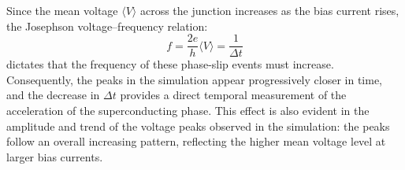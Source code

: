 Since the mean voltage $\langle V \rangle$ across the junction increases as the bias current rises, the Josephson voltage--frequency relation:
\[
f = \frac{2e}{h}\langle V \rangle = \frac{1}{\Delta t}
\]
dictates that the frequency of these phase-slip events must increase. Consequently, the peaks in the simulation appear progressively closer in time, and the decrease in $\Delta t$ provides a direct temporal measurement of the acceleration of the superconducting phase. This effect is also evident in the amplitude and trend of the voltage peaks observed in the simulation: the peaks follow an overall increasing pattern, reflecting the higher mean voltage level at larger bias currents.



